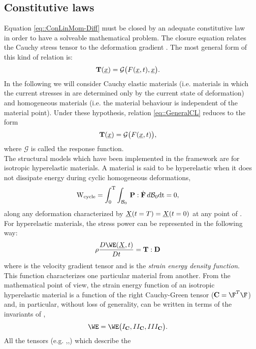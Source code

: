 \subsection{Constitutive laws}
\label{sct-Constitutive} Equation \eqref{eq::ConLinMom-Diff} must be
closed by an adequate constitutive law in order to have a solveable
mathematical problem. The closure equation relates the Cauchy stress
tensor \T to the deformation gradient \F. The most general form of
this kind of relation is:
\begin{equation} \textbf{T}(\underline{x})=\mathcal{G}\big(F(\underline{x},t),\underline{x}\big).
  \label{eq::GeneralCL}
\end{equation} In the following we will consider Cauchy elastic
materials (i.e. materials in which the current stresses in \CurCon are
determined only by the current state of deformation) and homogeneous
materials (i.e. the material behaviour is independent of the material
point). Under these hypothesis, relation \eqref{eq::GeneralCL} reduces
to the form
\begin{equation} \textbf{T}(\underline{x})=\mathcal{G}\big(F(\underline{x},t)\big),
  \label{eq::OurRelation}
\end{equation} where $\mathcal{G}$ is called the response function.\\
The structural models which have been implemented in the \SSol
framework are for isotropic hyperelastic materials. A material is said
to be hyperelastic when it does not dissipate energy during cyclic
homogeneous deformations,
\begin{equation} \text{W}_{\text{cycle}} =
  \int_{0}^{\text{T}}\int_{\mathcal{B}_0}\,\mathbf{P}:\dot{\mathbf{F}}\,d\mathcal{B}_0\text{dt}
  = 0,
  \label{eq::energyDiss}
\end{equation} along any deformation characterized by
$\underline{X}(t=T)=\underline{X}(t=0)$ at any point of \RefCon. For hyperelastic
materials, the stress power can be represented in the following way:
\begin{equation} \rho\frac{D\WE(\posE,t)}{Dt}=\T:\D
  \label{eq::HyperSP}
\end{equation} where \D is the velocity gradient tensor and \W is the
\textit{strain energy density function}. This function characterizes
one particular material from another. From the mathematical point of
view, the strain energy function of an isotropic hyperelastic material
is a function of the right Cauchy-Green tensor ($\C=\F^{T}\F$) and, in
particular, without loss of generality, \W can be written in terms of
the invariants of \C,
\begin{equation} \WE=\WE\big(I_{\C},II_{\C},III_{\C}\big).
  \label{eq::WandInvariants}
\end{equation} All the tensors (e.g. \F,\T,\Piola) which describe the
